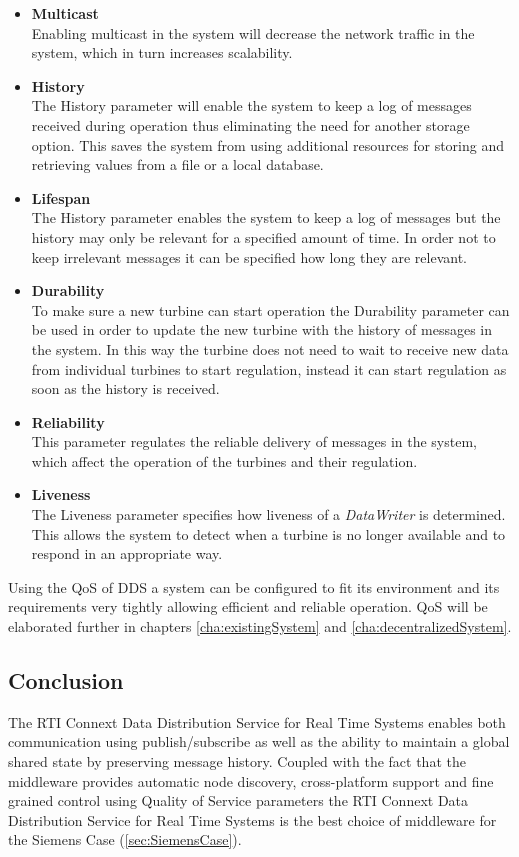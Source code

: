 \begin{itemize}
	\item \textbf{Multicast} \\
		Enabling multicast in the system will decrease the network traffic in the system, which in turn increases scalability.
		
	\item \textbf{History} \\
		The History parameter will enable the system to keep a log of messages received during operation thus eliminating the need for another storage option. This saves the system from using additional resources for storing and retrieving values from a file or a local database.
		
	\item \textbf{Lifespan} \\
		The History parameter enables the system to keep a log of messages but the history may only be relevant for a specified amount of time. In order not to keep irrelevant messages it can be specified how long they are relevant.
	
	\item \textbf{Durability} \\
		To make sure a new turbine can start operation the Durability parameter can be used in order to update the new turbine with the history of messages in the system. In this way the turbine does not need to wait to receive new data from individual turbines to start regulation, instead it can start regulation as soon as the history is received.
		
	\item \textbf{Reliability} \\
		This parameter regulates the reliable delivery of messages in the system, which affect the operation of the turbines and their regulation.
		
	\item \textbf{Liveness} \\
		The Liveness parameter specifies how liveness of a \textit{DataWriter} is determined. This allows the system to detect when a turbine is no longer available and to respond in an appropriate way.
\end{itemize}

Using the QoS of DDS a system can be configured to fit its environment and its requirements very tightly allowing efficient and reliable operation. QoS will be elaborated further in chapters \cref{cha:existingSystem} and \cref{cha:decentralizedSystem}.

\subsection{Conclusion}
The RTI Connext Data Distribution Service for Real Time Systems enables both communication using publish/subscribe as well as the ability to maintain a global shared state by preserving message history. Coupled with the fact that the middleware provides automatic node discovery, cross-platform support and fine grained control using Quality of Service parameters the RTI Connext Data Distribution Service for Real Time Systems is the best choice of middleware for the Siemens Case (\cref{sec:SiemensCase}).